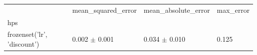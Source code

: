 \begin{tabular}{llll}
\toprule
 & mean_squared_error & mean_absolute_error & max_error \\
hps &  &  &  \\
\midrule
frozenset({'lr', 'discount'}) & 0.002 $\pm$ 0.001 & 0.034 $\pm$ 0.010 & 0.125 \\
\bottomrule
\end{tabular}
